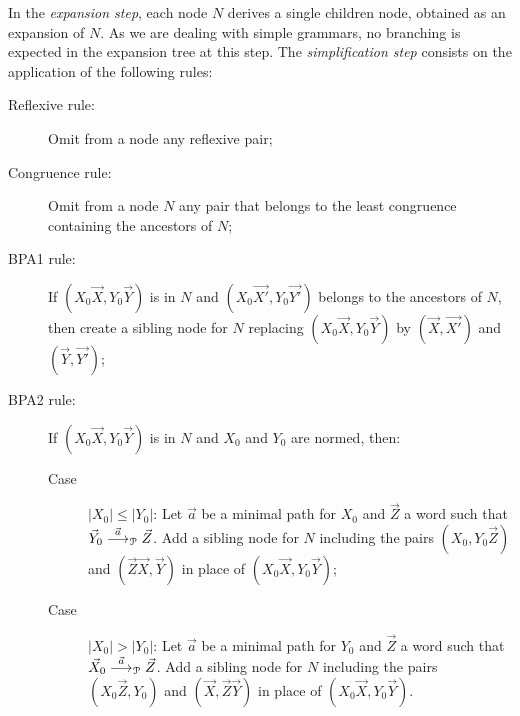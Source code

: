 In the \emph{expansion step}, each node $N$ derives a single children
node, obtained as an expansion of $N$. As we are dealing with simple
grammars, no branching is expected in the expansion tree at this
step.
%
The \emph{simplification step} consists on the application of the
following rules:
%
\begin{description}
\item[Reflexive rule:] Omit from a node any reflexive pair;
\item[Congruence rule:] Omit from a node $N$ any pair that belongs to
  the least congruence containing the ancestors of $N$;
\item[BPA1 rule:] If $(X_0 \vec X, Y_0 \vec Y)$ is in
  $N$ and $(X_0 \vec {X'}, Y_0 \vec {Y'})$ belongs to the ancestors of
  $N$, then create a sibling node for $N$ replacing
  $(X_0 \vec X, Y_0 \vec Y)$ by $(\vec X, \vec {X'})$ and
  $(\vec Y, \vec {Y'})$;
\item[BPA2 rule:] If $(X_0 \vec X, Y_0 \vec Y)$ is in $N$
  and $X_0$ and $Y_0$ are normed, then:
  \begin{description}
  \item[Case] $|X_0| \leq |Y_0|$: Let $\vec a$ be a minimal path
    for $X_0$ and $\vec Z$ a word such that
    $\vec Y_0 \LTSderivesP[\vec a] \vec Z$. Add a sibling node for
    $N$ including the pairs $(X_0, Y_0 \vec Z)$ and
    $(\vec Z \vec X, \vec Y)$ in place of $(X_0 \vec X, Y_0 \vec Y)$;
  \item[Case] $|X_0| > |Y_0|$: Let $\vec a$ be a minimal path for
    $Y_0$ and $\vec Z$ a word such that $\vec X_0 \LTSderivesP[\vec a] \vec
    Z$. Add a sibling node for $N$ including the pairs
    $(X_0 \vec Z, Y_0 )$ and $(\vec X, \vec Z \vec Y)$ in place of
    $(X_0 \vec X, Y_0 \vec Y)$.
  \end{description}
\end{description}

